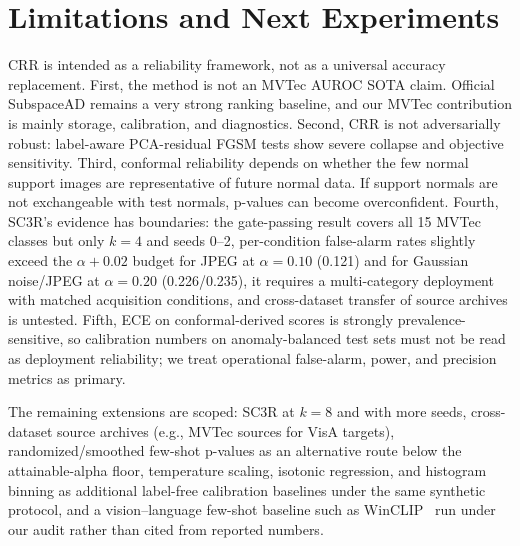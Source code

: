 \section{Limitations and Next Experiments}
CRR is intended as a reliability framework, not as a universal accuracy replacement. First, the method is not an MVTec AUROC SOTA claim. Official SubspaceAD remains a very strong ranking baseline, and our MVTec contribution is mainly storage, calibration, and diagnostics. Second, CRR is not adversarially robust: label-aware PCA-residual FGSM tests show severe collapse and objective sensitivity. Third, conformal reliability depends on whether the few normal support images are representative of future normal data. If support normals are not exchangeable with test normals, p-values can become overconfident. Fourth, SC3R's evidence has boundaries: the gate-passing result covers all 15 MVTec classes but only $k{=}4$ and seeds 0--2, per-condition false-alarm rates slightly exceed the $\alpha{+}0.02$ budget for JPEG at $\alpha{=}0.10$ (0.121) and for Gaussian noise/JPEG at $\alpha{=}0.20$ (0.226/0.235), it requires a multi-category deployment with matched acquisition conditions, and cross-dataset transfer of source archives is untested. Fifth, ECE on conformal-derived scores is strongly prevalence-sensitive, so calibration numbers on anomaly-balanced test sets must not be read as deployment reliability; we treat operational false-alarm, power, and precision metrics as primary.

The remaining extensions are scoped: SC3R at $k{=}8$ and with more seeds, cross-dataset source archives (e.g., MVTec sources for VisA targets), randomized/smoothed few-shot p-values as an alternative route below the attainable-alpha floor, temperature scaling, isotonic regression, and histogram binning as additional label-free calibration baselines under the same synthetic protocol, and a vision--language few-shot baseline such as WinCLIP~\cite{winclip2023} run under our audit rather than cited from reported numbers.
